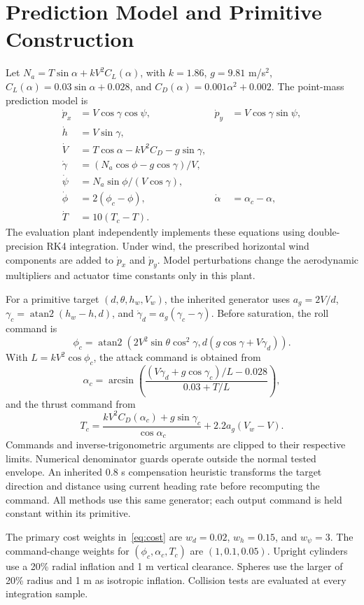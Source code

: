 \section{Prediction Model and Primitive Construction}\label{app:model}
Let $N_a=T\sin\alpha+kV^2C_L(\alpha)$, with $k=1.86$, $g=9.81$ m/s$^2$, $C_L(\alpha)=0.03\sin\alpha+0.028$, and $C_D(\alpha)=0.001\alpha^2+0.002$. The point-mass prediction model is
\begin{align}
 \dot p_x&=V\cos\gamma\cos\psi,&\dot p_y&=V\cos\gamma\sin\psi,\\
 \dot h&=V\sin\gamma,\\
 \dot V&=T\cos\alpha-kV^2C_D-g\sin\gamma,\\
 \dot\gamma&=(N_a\cos\phi-g\cos\gamma)/V,\\
 \dot\psi&=N_a\sin\phi/(V\cos\gamma),\\
 \dot\phi&=2(\phi_c-\phi),&\dot\alpha&=\alpha_c-\alpha,\\
 \dot T&=10(T_c-T).
\end{align}
The evaluation plant independently implements these equations using double-precision RK4 integration. Under wind, the prescribed horizontal wind components are added to $\dot p_x$ and $\dot p_y$. Model perturbations change the aerodynamic multipliers and actuator time constants only in this plant.

For a primitive target $(d,\theta,h_w,V_w)$, the inherited generator uses $a_g=2V/d$, $\gamma_c=\operatorname{atan2}(h_w-h,d)$, and $\dot\gamma_d=a_g(\gamma_c-\gamma)$. Before saturation, the roll command is
\begin{equation}
 \phi_c=\operatorname{atan2}\!\left(2V^2\sin\theta\cos^2\gamma,
 d(g\cos\gamma+V\dot\gamma_d)\right).
\end{equation}
With $L=kV^2\cos\phi_c$, the attack command is obtained from
\begin{equation}
 \alpha_c=\arcsin\!\left(
 \frac{(V\dot\gamma_d+g\cos\gamma_c)/L-0.028}{0.03+T/L}\right),
\end{equation}
and the thrust command from
\begin{equation}
 T_c=\frac{kV^2C_D(\alpha_c)+g\sin\gamma_c}{\cos\alpha_c}
       +2.2a_g(V_w-V).
\end{equation}
Commands and inverse-trigonometric arguments are clipped to their respective limits. Numerical denominator guards operate outside the normal tested envelope. An inherited 0.8 s compensation heuristic transforms the target direction and distance using current heading rate before recomputing the command. All methods use this same generator; each output command is held constant within its primitive.

The primary cost weights in~\eqref{eq:cost} are $w_d=0.02$, $w_h=0.15$, and $w_\psi=3$. The command-change weights for $(\phi_c,\alpha_c,T_c)$ are $(1,0.1,0.05)$. Upright cylinders use a 20\% radial inflation and 1 m vertical clearance. Spheres use the larger of 20\% radius and 1 m as isotropic inflation. Collision tests are evaluated at every integration sample.

